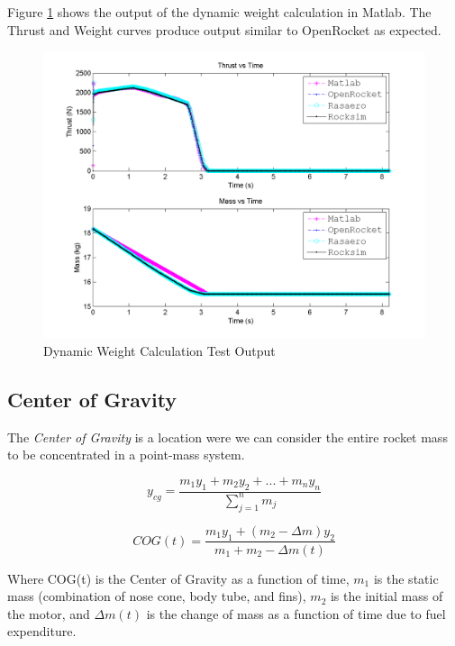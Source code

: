 \documentclass[]{book}
\begin{document}
Figure \ref{dynamic_weight_calculation_test_figure_label} shows the
output of the dynamic weight calculation in Matlab. The Thrust and
Weight curves produce output similar to OpenRocket as expected.

\begin{figure}[htbp]
\centering
\includegraphics{images/plots/error_thrust_mass.png}
\caption{Dynamic Weight Calculation Test Output
\label{dynamic_weight_calculation_test_figure_label}}
\end{figure}

\subsection{Center of Gravity}\label{center-of-gravity}

The \emph{Center of Gravity} is a location were we can consider the
entire rocket mass to be concentrated in a point-mass system.

\begin{equation}
y_{cg} = \dfrac{m_1 y_1 + m_2 y_2 + ... + m_n y_n}{\sum_{j=1}^n m_j}
\end{equation}

\begin{equation}
COG(t) = \dfrac{m_1 y_1 + (m_2 - \Delta m) y_2}{m_1 + m_2 - \Delta m(t)} 
\end{equation}

Where COG(t) is the Center of Gravity as a function of time, \(m_1\) is
the static mass (combination of nose cone, body tube, and fins), \(m_2\)
is the initial mass of the motor, and \(\Delta m(t)\) is the change of
mass as a function of time due to fuel expenditure.
\end{document}
